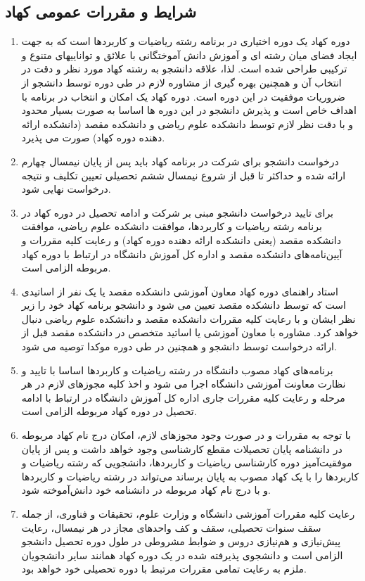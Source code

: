 \documentclass{article}
\begin{document}
\subsection{
شرایط و مقررات عمومی کهاد
}
\begin{enumerate}
    \item
     دوره کهاد یک دوره اختیاری در برنامه رشته ریاضیات و کاربردها است که به جهت ایجاد فضای میان رشته ای و آموزش دانش آموختگانی با علائق و تواناییهای متنوع و ترکیبی طراحی شده است. لذا، علاقه دانشجو به رشته کهاد مورد نظر و دقت در انتخاب آن و همچنین بهره گیری از مشاوره لازم در طی دوره توسط دانشجو از ضروریات موفقیت در این دوره است. دوره کهاد یک امکان و انتخاب در برنامه با اهداف خاص است و پذیرش دانشجو در این دوره ها اساسا به صورت بسیار محدود و با دقت نظر لازم توسط دانشکده علوم ریاضی و دانشکده مقصد (دانشکده ارائه دهنده دوره کهاد) صورت می پذیرد.
	\item
	 درخواست دانشجو برای شرکت در برنامه کهاد باید پس از پایان نیمسال چهارم ارائه شده و حداکثر تا قبل از شروع نیمسال ششم تحصیلی تعیین تکلیف و نتیجه درخواست نهایی شود.
	\item
	 برای تایید درخواست دانشجو مبنی بر شرکت و ادامه تحصیل در دوره کهاد در برنامه رشته ریاضیات و کاربردها، موافقت دانشکده علوم ریاضی، موافقت دانشکده مقصد (یعنی دانشکده ارائه دهنده دوره کهاد) و رعایت کلیه مقررات و آیین‌نامه‌های دانشکده مقصد و اداره کل آموزش دانشگاه در ارتباط با دوره کهاد مربوطه الزامی است.
	\item
	 استاد راهنمای دوره کهاد معاون آموزشی دانشکده مقصد یا یک نفر از اساتیدی است که توسط دانشکده مقصد تعیین می شود و دانشجو برنامه کهاد خود را زیر نظر ایشان و با رعایت کلیه مقررات دانشکده مقصد و دانشکده علوم ریاضی دنبال خواهد کرد. مشاوره با معاون آموزشی یا اساتید متخصص در دانشکده مقصد قبل از ارائه درخواست توسط دانشجو و همچنین در طی دوره موکدا توصیه می شود.
	\item
	 برنامه‌های کهاد مصوب دانشگاه در رشته ریاضیات و کاربردها اساسا با تایید و نظارت معاونت آموزشی دانشگاه اجرا می شود و اخذ کلیه مجوزهای لازم در هر مرحله و رعایت کلیه مقررات جاری اداره کل آموزش دانشگاه در ارتباط با ادامه تحصیل در دوره کهاد مربوطه الزامی است.
	\item
	 با توجه به مقررات و در صورت وجود مجوزهای لازم، امکان درج نام کهاد مربوطه در دانشنامه پایان تحصیلات مقطع کارشناسی وجود خواهد داشت و پس از پایان موفقیت‌آمیز دوره کارشناسی ریاضیات و کاربردها، دانشجویی که رشته ریاضیات و کاربردها را با یک کهاد مصوب به پایان برساند می‌تواند در رشته ریاضیات و کاربردها و با درج نام کهاد مربوطه در دانشنامه خود دانش‌آموخته شود.
	\item
	رعایت کلیه مقررات آموزشی دانشگاه و وزارت علوم، تحقیقات و فناوری، از جمله سقف سنوات تحصیلی، سقف و کف واحدهای مجاز در هر نیمسال، رعایت پیش‌نیازی و هم‌نیازی دروس و ضوابط مشروطی در طول دوره تحصیل دانشجو الزامی است و دانشجوی پذیرفته شده در یک دوره کهاد همانند سایر دانشجویان ملزم به رعایت تمامی مقررات مرتبط با دوره تحصیلی خود خواهد بود.
\end{enumerate}
\end{document}
